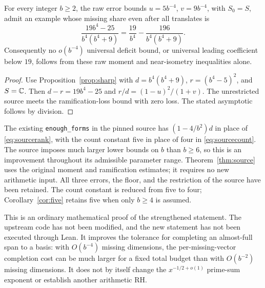 \begin{proposition}
For every integer \(b\ge2\), the raw error bounds
\(u=5b^{-4}\), \(v=9b^{-4}\), with \(S_0=S\), admit an
example whose missing share even after all translates is
\[
 \frac{19b^4-25}{b^4(b^4+9)}
 =\frac{19}{b^4}-\frac{196}{b^4(b^4+9)}.
\]
Consequently no \(o(b^{-4})\) universal deficit bound, or
universal leading coefficient below \(19\), follows from these
raw moment and near-isometry inequalities alone.
\end{proposition}
\begin{proof}
Use Proposition~\ref{prop:sharp} with
\(d=b^4(b^4+9)\), \(r=(b^4-5)^2\), and \(S=\mathbb C\).
Then \(d-r=19b^4-25\) and \(r/d=(1-u)^2/(1+v)\).
The unrestricted source meets the ramification-loss bound with
zero loss. The stated asymptotic follows by division.
\end{proof}

\begin{remark}
The existing \texttt{enough\_forms} in the pinned source has
\((1-4/b^2)d\) in place of \eqref{eq:sourcerank}, with the count constant five in place of four in \eqref{eq:sourcecount}. The source imposes much
larger lower bounds on \(b\) than \(b\ge6\), so this is an
improvement throughout its admissible parameter range. Theorem~\ref{thm:source}
uses the original moment and ramification estimates; it requires no
new arithmetic input. All three errors, the floor, and the restriction
of the source have been retained. The count constant is reduced from five to four; Corollary~\ref{cor:five} retains five when only \(b\ge4\) is assumed.

This is an ordinary mathematical proof of the strengthened statement.
The upstream code has not been modified, and the new statement has not
been executed through Lean. It improves the tolerance for completing
an almost-full span to a basis: with \(O(b^{-4})\) missing dimensions,
the per-missing-vector completion cost can be much larger for a fixed
total budget than with \(O(b^{-2})\) missing dimensions. It does not
by itself change the \(x^{-1/2+o(1)}\) prime-sum exponent or establish
another arithmetic RH.
\end{remark}

